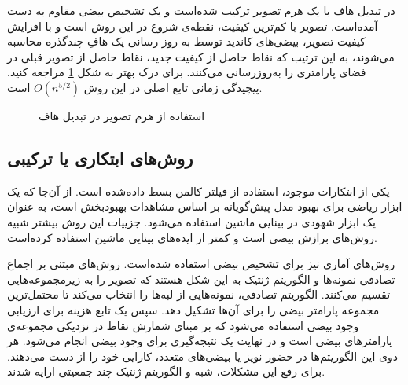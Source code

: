 \documentclass[12pt,a4paper]{article}
\numberwithin{equation}{section}
\numberwithin{figure}{section}
\theoremstyle{definition}
\theoremstyle{theorem}
\theoremstyle{definition}
\begin{document}
در \cite{ellipticalHT} تبدیل هاف با یک هرم تصویر ترکیب شده‌است و یک تشخیص بیضی مقاوم به دست آمده‌است. تصویر با کم‌ترین کیفیت، نقطه‌ی شروع در این روش است و با افزایش کیفیت تصویر، بیضی‌های کاندید توسط به روز رسانی یک هافِ چندگذره محاسبه می‌شوند، به این ترتیب که نقاط حاصل از کیفیت جدید، نقاط حاصل از تصویر قبلی در فضای پارامتری را به‌روزرسانی می‌کنند. برای درک بهتر به شکل \ref{fig:elliptic} مراجعه کنید. پیچیدگی زمانی تابع اصلی در این روش 
\( O(n^{5/2}) \)
است. 
\begin{figure}[h]
\centering
{}
\caption{استفاده از هرم تصویر در تبدیل هاف \cite{ellipticalHT} }
\label{fig:elliptic}
\end{figure}


\subsection{روش‌های ابتکاری یا ترکیبی}

یکی از ابتکارات موجود، استفاده از فیلتر کالمن بسط‌ داده‌شده است. از آن‌جا که  یک ابزار ریاضی برای بهبود مدل پیش‌گویانه بر اساس مشاهدات بهبود‌بخش است،‌ به عنوان یک ابزار شهودی در بینایی ماشین استفاده می‌شود\cite{EKF}. جزییات این روش بیشتر شبیه روش‌های برازش بیضی است و کمتر از ایده‌های بینایی ماشین استفاده کرده‌است. 


روش‌های آماری نیز برای تشخیص بیضی استفاده شده‌است. روش‌های مبتنی بر اجماع تصادفی نمونه‌ها\cite{RANSAC} و الگوریتم‌ ژنتیک\cite{GA} به این شکل هستند که تصویر را به زیرمجموعه‌هایی تقسیم می‌کنند. الگوریتم تصادفی، نمونه‌هایی از لبه‌ها را انتخاب می‌کند تا محتمل‌ترین مجموعه پارامتر بیضی را برای آن‌ها تشکیل دهد. سپس یک تابع هزینه برای ارزیابی وجود بیضی استفاده می‌شود که بر مبنای شمارش نقاط در نزدیکی مجموعه‌ی پارامترهای بیضی است و در نهایت یک نتیجه‌گیری برای وجود بیضی انجام می‌شود. هر دوی این الگوریتم‌ها در حضور نویز یا بیضی‌های متعدد، کارایی خود را از دست می‌دهند. برای رفع این مشکلات، شبه \cite{pRANSAC} و الگوریتم ژنتیک چند جمعیتی\cite{mulGA} ارایه شدند. 
\end{document}
